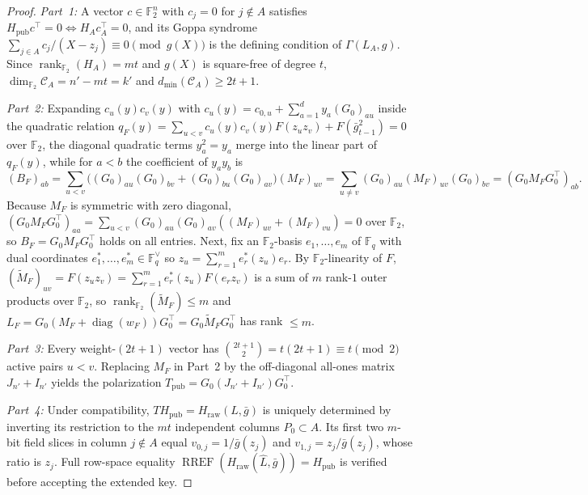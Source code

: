 \documentclass[11pt,a4paper]{article}
\theoremstyle{definition}
\theoremstyle{remark}
\newcommand{\F}{\mathbb{F}}
\newcommand{\rk}{\operatorname{rank}}
\newcommand{\diag}{\operatorname{diag}}
\newcommand{\RREF}{\operatorname{RREF}}
\begin{document}
\begin{proof}
\emph{Part~1:} A vector $c \in \F_2^n$ with $c_j = 0$ for $j \notin A$ satisfies $H_{\text{pub}} c^\top = 0 \iff H_A c_A^\top = 0$, and its Goppa syndrome $\sum_{j \in A} c_j / (X - z_j) \equiv 0 \pmod{g(X)}$ is the defining condition of $\Gamma(L_A, g)$. Since $\rk_{\F_2}(H_A) = mt$ and $g(X)$ is square-free of degree $t$, $\dim_{\F_2}\mathcal{C}_A = n' - mt = k'$ and $d_{\min}(\mathcal{C}_A) \ge 2t + 1$.

\emph{Part~2:} Expanding $c_u(y) c_v(y)$ with $c_u(y) = c_{0, u} + \sum_{a=1}^d y_a (G_0)_{au}$ inside the quadratic relation $q_F(y) = \sum_{u < v} c_u(y) c_v(y) F(z_u z_v) + F(\bar{g}_{t-1}^2) = 0$ over $\F_2$, the diagonal quadratic terms $y_a^2 = y_a$ merge into the linear part of $q_F(y)$, while for $a < b$ the coefficient of $y_a y_b$ is
\[
    (B_F)_{ab} = \sum_{u < v}\!\big((G_0)_{au}(G_0)_{bv} + (G_0)_{bu}(G_0)_{av}\big)(M_F)_{uv}
    = \sum_{u \neq v} (G_0)_{au}(M_F)_{uv}(G_0)_{bv}
    = (G_0 M_F G_0^\top)_{ab}.
\]
Because $M_F$ is symmetric with zero diagonal, $(G_0 M_F G_0^\top)_{aa} = \sum_{u < v}(G_0)_{au}(G_0)_{av}((M_F)_{uv} + (M_F)_{vu}) = 0$ over $\F_2$, so $B_F = G_0 M_F G_0^\top$ holds on all entries. Next, fix an $\F_2$-basis $e_1, \dots, e_m$ of $\F_q$ with dual coordinates $e_1^*, \dots, e_m^* \in \F_q^\vee$ so $z_u = \sum_{r=1}^m e_r^*(z_u) e_r$. By $\F_2$-linearity of $F$, $(\widetilde{M}_F)_{uv} = F(z_u z_v) = \sum_{r=1}^m e_r^*(z_u) F(e_r z_v)$ is a sum of $m$ rank-$1$ outer products over $\F_2$, so $\rk_{\F_2}(\widetilde{M}_F) \le m$ and $L_F = G_0(M_F + \diag(w_F))G_0^\top = G_0 \widetilde{M}_F G_0^\top$ has rank $\le m$.

\emph{Part~3:} Every weight-$(2t+1)$ vector has $\binom{2t+1}{2} = t(2t+1) \equiv t \pmod 2$ active pairs $u < v$. Replacing $M_F$ in Part~2 by the off-diagonal all-ones matrix $J_{n'} + I_{n'}$ yields the polarization $T_{\text{pub}} = G_0(J_{n'} + I_{n'})G_0^\top$.

\emph{Part~4:} Under compatibility, $T H_{\text{pub}} = H_{\text{raw}}(L, \bar{g})$ is uniquely determined by inverting its restriction to the $mt$ independent columns $P_0 \subset A$. Its first two $m$-bit field slices in column $j \notin A$ equal $v_{0, j} = 1/\bar{g}(z_j)$ and $v_{1, j} = z_j/\bar{g}(z_j)$, whose ratio is $z_j$. Full row-space equality $\RREF(H_{\text{raw}}(\hat{L}, \bar{g})) = H_{\text{pub}}$ is verified before accepting the extended key.
\end{proof}
\end{document}
